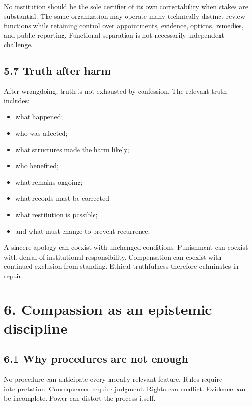 \documentclass[
  11pt,
]{article}
\providecommand{\tightlist}{%
  \setlength{\itemsep}{0pt}\setlength{\parskip}{0pt}}
\begin{document}
No institution should be the sole certifier of its own correctability
when stakes are substantial. The same organization may operate many
technically distinct review functions while retaining control over
appointments, evidence, options, remedies, and public reporting.
Functional separation is not necessarily independent challenge.

\subsection{5.7 Truth after harm}\label{truth-after-harm}

After wrongdoing, truth is not exhausted by confession. The relevant
truth includes:

\begin{itemize}
\tightlist
\item
  what happened;
\item
  who was affected;
\item
  what structures made the harm likely;
\item
  who benefited;
\item
  what remains ongoing;
\item
  what records must be corrected;
\item
  what restitution is possible;
\item
  and what must change to prevent recurrence.
\end{itemize}

A sincere apology can coexist with unchanged conditions. Punishment can
coexist with denial of institutional responsibility. Compensation can
coexist with continued exclusion from standing. Ethical truthfulness
therefore culminates in repair.

\section{6. Compassion as an epistemic
discipline}\label{compassion-as-an-epistemic-discipline}

\subsection{6.1 Why procedures are not
enough}\label{why-procedures-are-not-enough}

No procedure can anticipate every morally relevant feature. Rules
require interpretation. Consequences require judgment. Rights can
conflict. Evidence can be incomplete. Power can distort the process
itself.
\end{document}
